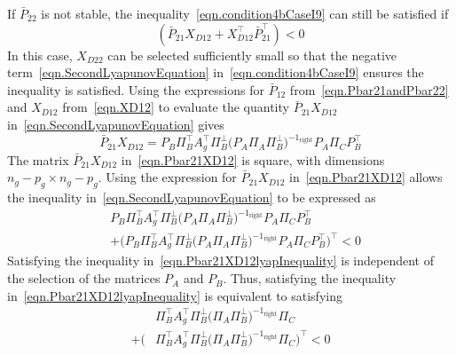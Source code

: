 \documentclass[journal]{IEEEtran}
\theoremstyle{innercustomthm}
\begin{document}
  If $\bar{P}_{22}$ is not stable, the inequality\ \eqref{eqn.condition4bCaseI9} can still be satisfied if
  \begin{equation}
    \label{eqn.SecondLyapunovEquation}
    (\bar{P}_{21}X_{D12} + X_{D12}^{\top}\bar{P}_{21}^{\top}) < 0
  \end{equation}
  In this case, $X_{D22}$ can be selected sufficiently small so that the negative term\ \eqref{eqn.SecondLyapunovEquation} in\ \eqref{eqn.condition4bCaseI9} ensures the inequality is satisfied.
  Using the expressions for $\bar{P}_{12}$ from\ \eqref{eqn.Pbar21andPbar22} and $X_{D12}$ from\ \eqref{eqn.XD12} to evaluate the quantity $\bar{P}_{21}X_{D12}$ in\ \eqref{eqn.SecondLyapunovEquation} gives
  {%
    \small
    \begin{equation}
      \label{eqn.Pbar21XD12}
      \bar{P}_{21}X_{D12}
      =
      P_{B}\Pi_{B}^{\top}A_{g}^{\top}\Pi_{B}^{\perp}
      \bigr(P_{A}\Pi_{A}\Pi_{B}^{\perp}\bigr)^{-1_{\text{right}}}
      P_{A}\Pi_{C}P_{B}^{\top}
    \end{equation}
  }%
  The matrix $\bar{P}_{21}X_{D12}$ in\ \eqref{eqn.Pbar21XD12} is square, with dimensions $n_{g}-p_{g}\times n_{g}-p_{g}$.
  Using the expression for $\bar{P}_{21}X_{D12}$ in\ \eqref{eqn.Pbar21XD12} allows the inequality in\ \eqref{eqn.SecondLyapunovEquation} to be expressed as
  {%
    \small
    \begin{equation}
      \label{eqn.Pbar21XD12lyapInequality}
      \begin{split}
        &
        P_{B}\Pi_{B}^{\top}A_{g}^{\top}\Pi_{B}^{\perp}
        \bigr(P_{A}\Pi_{A}\Pi_{B}^{\perp}\bigr)^{-1_{\text{right}}}
        P_{A}\Pi_{C}P_{B}^{\top}  \\
        & +
        \bigr(
        P_{B}\Pi_{B}^{\top}A_{g}^{\top}\Pi_{B}^{\perp}
        \bigr(P_{A}\Pi_{A}\Pi_{B}^{\perp}\bigr)^{-1_{\text{right}}}
        P_{A}\Pi_{C}P_{B}^{\top}
        \bigr)^{\top}
        <0
      \end{split}
    \end{equation}
  }%
  Satisfying the inequality in\ \eqref{eqn.Pbar21XD12lyapInequality} is independent of the selection of the matrices $P_{A}$ and $P_{B}$.
  Thus, satisfying the inequality in\ \eqref{eqn.Pbar21XD12lyapInequality} is equivalent to satisfying
  \begin{equation}
    \label{eqn.Pbar21XD12lyapInequality3}
    \begin{split}
      &
      \Pi_{B}^{\top}A_{g}^{\top}\Pi_{B}^{\perp}
      \bigr(\Pi_{A}\Pi_{B}^{\perp}\bigr)^{-1_{\text{right}}}
      \Pi_{C}  \\
      +
      \bigr(
      &
      \Pi_{B}^{\top}A_{g}^{\top}\Pi_{B}^{\perp}
      \bigr(\Pi_{A}\Pi_{B}^{\perp}\bigr)^{-1_{\text{right}}}
      \Pi_{C}
      \bigr)^{\top}
      <0
    \end{split}
  \end{equation}
\end{document}
